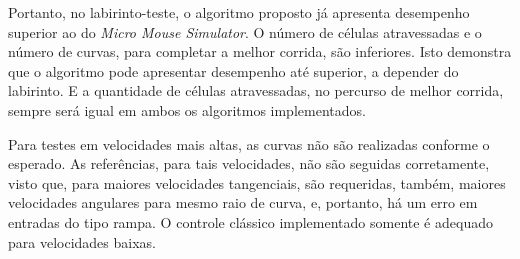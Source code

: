 Portanto, no labirinto-teste, o algoritmo proposto já apresenta desempenho superior ao do \emph{Micro Mouse Simulator}. O número de células atravessadas e o número de curvas, para completar a melhor corrida, são inferiores. Isto demonstra que o algoritmo pode apresentar desempenho até superior, a depender do labirinto. E a quantidade de células atravessadas, no percurso de melhor corrida, sempre será igual em ambos os algoritmos implementados.

Para testes em velocidades mais altas, as curvas não são realizadas conforme o esperado. As referências, para tais velocidades, não são seguidas corretamente, visto que, para maiores velocidades tangenciais, são requeridas, também, maiores velocidades angulares para mesmo raio de curva, e, portanto, há um erro em entradas do tipo rampa. O controle clássico implementado somente é adequado para velocidades baixas.